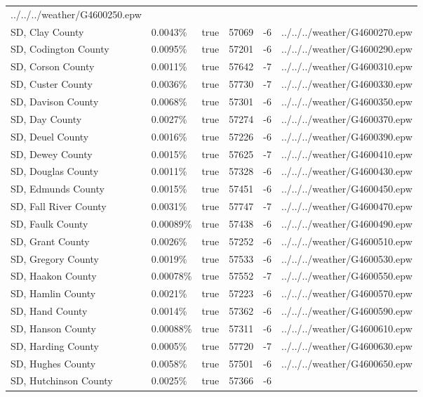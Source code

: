 \begin{longtable}[]{@{}llllll@{}}
../../../weather/G4600250.epw \\
SD, Clay County & 0.0043\% & true & 57069 & -6 &
../../../weather/G4600270.epw \\
SD, Codington County & 0.0095\% & true & 57201 & -6 &
../../../weather/G4600290.epw \\
SD, Corson County & 0.0011\% & true & 57642 & -7 &
../../../weather/G4600310.epw \\
SD, Custer County & 0.0036\% & true & 57730 & -7 &
../../../weather/G4600330.epw \\
SD, Davison County & 0.0068\% & true & 57301 & -6 &
../../../weather/G4600350.epw \\
SD, Day County & 0.0027\% & true & 57274 & -6 &
../../../weather/G4600370.epw \\
SD, Deuel County & 0.0016\% & true & 57226 & -6 &
../../../weather/G4600390.epw \\
SD, Dewey County & 0.0015\% & true & 57625 & -7 &
../../../weather/G4600410.epw \\
SD, Douglas County & 0.0011\% & true & 57328 & -6 &
../../../weather/G4600430.epw \\
SD, Edmunds County & 0.0015\% & true & 57451 & -6 &
../../../weather/G4600450.epw \\
SD, Fall River County & 0.0031\% & true & 57747 & -7 &
../../../weather/G4600470.epw \\
SD, Faulk County & 0.00089\% & true & 57438 & -6 &
../../../weather/G4600490.epw \\
SD, Grant County & 0.0026\% & true & 57252 & -6 &
../../../weather/G4600510.epw \\
SD, Gregory County & 0.0019\% & true & 57533 & -6 &
../../../weather/G4600530.epw \\
SD, Haakon County & 0.00078\% & true & 57552 & -7 &
../../../weather/G4600550.epw \\
SD, Hamlin County & 0.0021\% & true & 57223 & -6 &
../../../weather/G4600570.epw \\
SD, Hand County & 0.0014\% & true & 57362 & -6 &
../../../weather/G4600590.epw \\
SD, Hanson County & 0.00088\% & true & 57311 & -6 &
../../../weather/G4600610.epw \\
SD, Harding County & 0.0005\% & true & 57720 & -7 &
../../../weather/G4600630.epw \\
SD, Hughes County & 0.0058\% & true & 57501 & -6 &
../../../weather/G4600650.epw \\
SD, Hutchinson County & 0.0025\% & true & 57366 & -6 &

\end{longtable}
